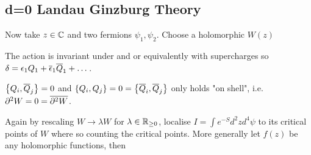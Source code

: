 \documentclass{article}
\begin{document}
\subsection{d=0 Landau Ginzburg Theory}
Now take $z\in\mbb{C}$ and two fermions $\psi_1,\psi_2$. Choose a holomorphic $W(z)$
\begin{prop}
The action is invariant under 
and 
or equivalently with supercharges
so $\delta= \eps_1 Q_1 + \bar{\eps}_1 \bar{Q}_1 + \dots$. 
\end{prop}
\begin{prop}
 $\acomm[Q_i]{\bar{Q}_j}=0$ and $\acomm[Q_i]{Q_j}=0=\acomm[\bar{Q}_i]{\bar{Q}_j}$ only holds "on shell", i.e. $\del^2 W = 0 = \bar{\del^2 W}$.
 \end{prop}
Again by rescaling $W \to \lambda W$ for $\lambda \in \mbb{R}_{\geq 0}$, localise $I = \int e^{-S} d^2z d^4\psi$ to its critical points of $W$ where 
so 
counting the critical points. More generally let $f(z)$ be any holomorphic functions, then 
\end{document}

